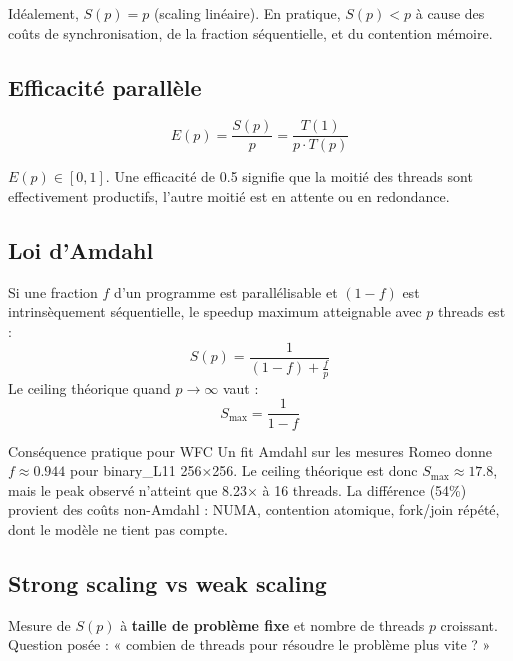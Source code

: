 Idéalement, $S(p) = p$ (scaling linéaire). En pratique, $S(p) < p$ à cause des coûts de synchronisation, de la fraction séquentielle, et du contention mémoire.

\subsection{Efficacité parallèle}

\begin{definition}
\[
E(p) = \frac{S(p)}{p} = \frac{T(1)}{p \cdot T(p)}
\]
\end{definition}

$E(p) \in [0, 1]$. Une efficacité de 0.5 signifie que la moitié des threads sont effectivement productifs, l'autre moitié est en attente ou en redondance.

\subsection{Loi d'Amdahl}

\begin{theorem}
Si une fraction $f$ d'un programme est parallélisable et $(1 - f)$ est intrinsèquement séquentielle, le speedup maximum atteignable avec $p$ threads est :
\[
S(p) = \frac{1}{(1 - f) + \frac{f}{p}}
\]
Le ceiling théorique quand $p \to \infty$ vaut :
\[
S_{\max} = \frac{1}{1 - f}
\]
\end{theorem}

\begin{important}{Conséquence pratique pour WFC}
Un fit Amdahl sur les mesures Romeo donne $f \approx 0.944$ pour binary\_L11 256×256. Le ceiling théorique est donc $S_{\max} \approx 17.8$, mais le peak observé n'atteint que 8.23× à 16 threads. La différence (54\%) provient des coûts non-Amdahl : NUMA, contention atomique, fork/join répété, dont le modèle ne tient pas compte.
\end{important}

\subsection{Strong scaling vs weak scaling}

\begin{definition}
Mesure de $S(p)$ à \textbf{taille de problème fixe} et nombre de threads $p$ croissant. Question posée : « combien de threads pour résoudre le problème plus vite ? »
\end{definition}

